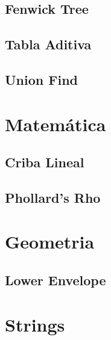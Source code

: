 \documentclass[a4paper,11pt,landscape,twocolumn]{article}
\begin{document}


\subsection{Fenwick Tree}



\subsection{Tabla Aditiva}



\subsection{Union Find}



\section{Matemática}

\subsection{Criba Lineal}



\subsection{Phollard's Rho}



\section{Geometria}



\subsection{Lower Envelope}



\section{Strings}
\end{document}
